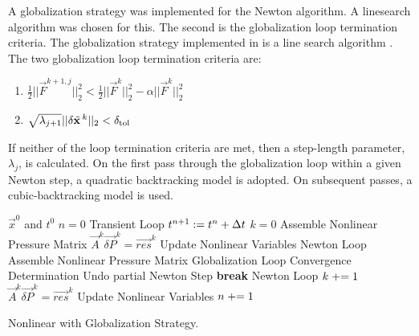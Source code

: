 A globalization strategy was implemented for the Newton algorithm.
A linesearch algorithm was chosen for this.
The second is the globalization loop termination criteria.
The globalization strategy implemented in \cobra{} is a line search algorithm \cite{Dennis1996}.
The two globalization loop termination criteria are:

\begin{enumerate}
\item{$\frac{1}{2}||\vec{F}^{k+1, j}||^{2}_{2} < \frac{1}{2}||\vec{F}^{k}||^{2}_{2} - \alpha ||\vec{F}^{k}||^{2}_{2}$ }
\item{$\sqrt{\lambda_{j+1}}||\delta \tilde{\vec{x}}^{k}||_{2} < \dtol{}$}
\end{enumerate}

If neither of the loop termination criteria are met, then a step-length parameter, $\lambda_j$, is calculated.
On the first pass through the globalization loop within a given Newton step, a quadratic backtracking model is adopted.
On subsequent passes, a cubic-backtracking model is used.

\begin{algo}[h!]
\setlength{\baselineskip}{0.625\baselineskip}
\begin{algorithmic}[1]
\Require $\vec{x}^{0}$ and $t^{0}$
\Set $n = 0$
\Loop \; Transient Loop
    \Set $t^{n+1} : = t^{n} + \dt{}$
    \Set $k = 0$
	\Algorithm Assemble Nonlinear Pressure Matrix	 
	\Solve $\vec{A}^{k} \vec{\delta P}^{k} = \vec{res}^{k}$
	\Algorithm Update Nonlinear Variables  
    \Loop \; Newton Loop
		\Algorithm Assemble Nonlinear Pressure Matrix 
		\Algorithm Globalization Loop %
		\Algorithm Convergence Determination 
			\State Undo partial Newton Step
			\State \textbf{break} Newton Loop 
		\EndIf		
		\Set $k \mathrel{+}= 1$
		\Solve $\vec{A}^{k} \vec{\delta P}^{k} = \vec{res}^{k}$
		\Algorithm Update Nonlinear Variables 
	\EndLoop
	\Set $n \mathrel{+}= 1$
\EndLoop
\end{algorithmic}
\caption{Nonlinear \cobra{} with Globalization Strategy.}
\label{alg:nlnGlobalizedAlgorithm}
\end{algo}

